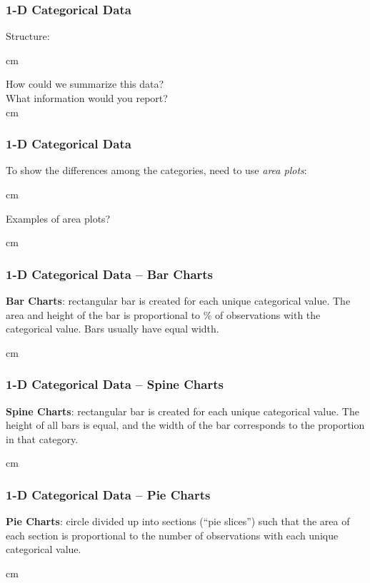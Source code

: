 \documentclass{beamer} %
\begin{document}
\begin{frame}\frametitle{1-D Categorical Data}
	\small
	
	Structure:
	
	 cm
	
	How could we summarize this data?\\
	What information would you report?\\
	
	 cm
	
\end{frame}

\begin{frame}\frametitle{1-D Categorical Data}
	\small
	
	To show the differences among the categories, need to use \emph{area plots}:
	
	 cm
	
	Examples of area plots?
	
	 cm
	
\end{frame}


\begin{frame}\frametitle{1-D Categorical Data -- Bar Charts}
	\small
	
	\textbf{Bar Charts}:  rectangular bar is created for each unique categorical value.  The area and height of the bar is proportional to \% of observations with the categorical value.  Bars usually have equal width.
	
	
	 cm
	
\end{frame}



\begin{frame}\frametitle{1-D Categorical Data -- Spine Charts}
	\small
	
	\textbf{Spine Charts}:  rectangular bar is created for each unique categorical value.  The height of all bars is equal, and the width of the bar corresponds to the proportion in that category.
	
	 cm
	
\end{frame}



\begin{frame}\frametitle{1-D Categorical Data -- Pie Charts}
	\small
	
	\textbf{Pie Charts}:  circle divided up into sections (``pie slices'') such that the area of each section is proportional to the number of observations with each unique categorical value.
	
	
	 cm
	
\end{frame}
\end{document}
